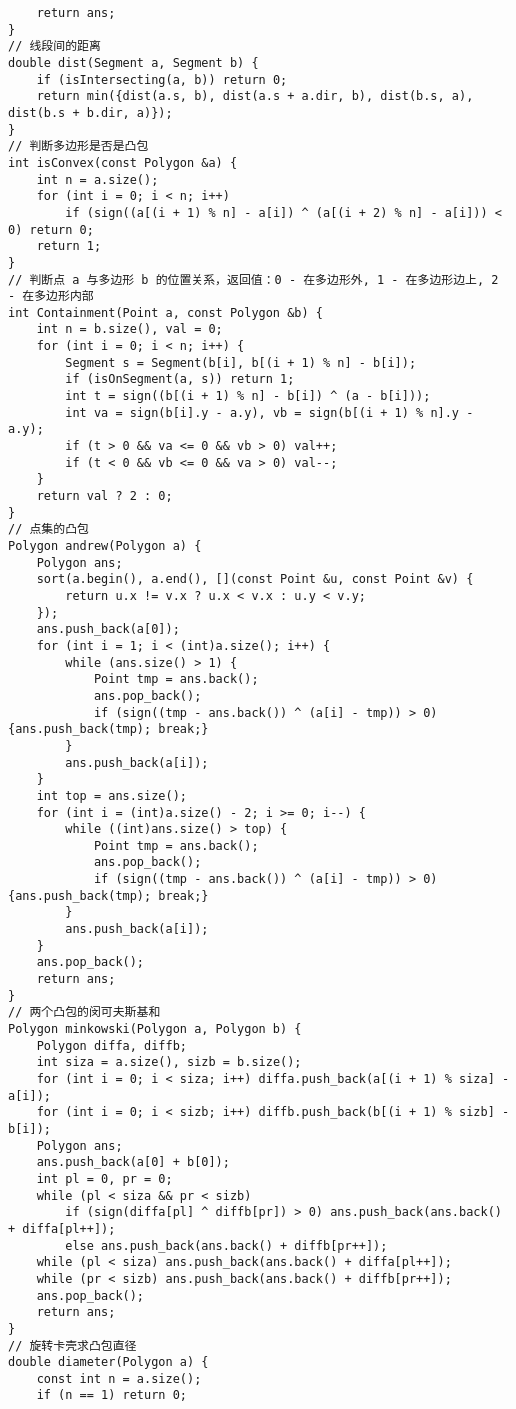\begin{verbatim}
    return ans;
}
// 线段间的距离
double dist(Segment a, Segment b) {
    if (isIntersecting(a, b)) return 0;
    return min({dist(a.s, b), dist(a.s + a.dir, b), dist(b.s, a), dist(b.s + b.dir, a)});
}
// 判断多边形是否是凸包
int isConvex(const Polygon &a) {
    int n = a.size();
    for (int i = 0; i < n; i++)
        if (sign((a[(i + 1) % n] - a[i]) ^ (a[(i + 2) % n] - a[i])) < 0) return 0;
    return 1;
}
// 判断点 a 与多边形 b 的位置关系，返回值：0 - 在多边形外, 1 - 在多边形边上, 2 - 在多边形内部
int Containment(Point a, const Polygon &b) {
    int n = b.size(), val = 0;
    for (int i = 0; i < n; i++) {
        Segment s = Segment(b[i], b[(i + 1) % n] - b[i]);
        if (isOnSegment(a, s)) return 1;
        int t = sign((b[(i + 1) % n] - b[i]) ^ (a - b[i]));
        int va = sign(b[i].y - a.y), vb = sign(b[(i + 1) % n].y - a.y);
        if (t > 0 && va <= 0 && vb > 0) val++;
        if (t < 0 && vb <= 0 && va > 0) val--;
    }
    return val ? 2 : 0;
}
// 点集的凸包
Polygon andrew(Polygon a) {
    Polygon ans;
    sort(a.begin(), a.end(), [](const Point &u, const Point &v) {
        return u.x != v.x ? u.x < v.x : u.y < v.y;
    });
    ans.push_back(a[0]);
    for (int i = 1; i < (int)a.size(); i++) {
        while (ans.size() > 1) {
            Point tmp = ans.back();
            ans.pop_back();
            if (sign((tmp - ans.back()) ^ (a[i] - tmp)) > 0) {ans.push_back(tmp); break;}
        }
        ans.push_back(a[i]);
    }
    int top = ans.size();
    for (int i = (int)a.size() - 2; i >= 0; i--) {
        while ((int)ans.size() > top) {
            Point tmp = ans.back();
            ans.pop_back();
            if (sign((tmp - ans.back()) ^ (a[i] - tmp)) > 0) {ans.push_back(tmp); break;}
        }
        ans.push_back(a[i]);
    }
    ans.pop_back();
    return ans;
}
// 两个凸包的闵可夫斯基和
Polygon minkowski(Polygon a, Polygon b) {
    Polygon diffa, diffb;
    int siza = a.size(), sizb = b.size();
    for (int i = 0; i < siza; i++) diffa.push_back(a[(i + 1) % siza] - a[i]);
    for (int i = 0; i < sizb; i++) diffb.push_back(b[(i + 1) % sizb] - b[i]);
    Polygon ans;
    ans.push_back(a[0] + b[0]);
    int pl = 0, pr = 0;
    while (pl < siza && pr < sizb)
        if (sign(diffa[pl] ^ diffb[pr]) > 0) ans.push_back(ans.back() + diffa[pl++]);
        else ans.push_back(ans.back() + diffb[pr++]);
    while (pl < siza) ans.push_back(ans.back() + diffa[pl++]);
    while (pr < sizb) ans.push_back(ans.back() + diffb[pr++]);
    ans.pop_back();
    return ans;
}
// 旋转卡壳求凸包直径
double diameter(Polygon a) {
    const int n = a.size();
    if (n == 1) return 0;

\end{verbatim}

